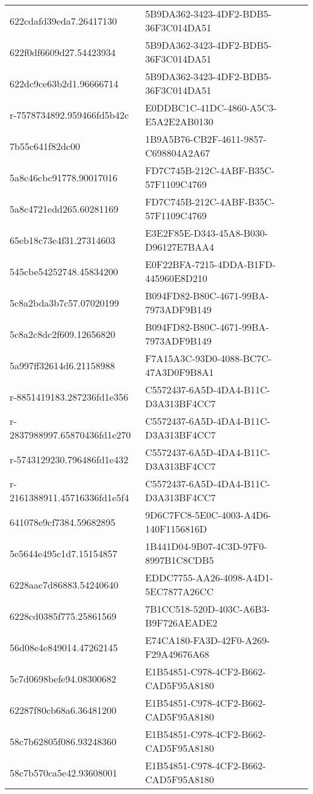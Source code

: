 \begin{tabular}{ll}
622cdafd39eda7.26417130 & 5B9DA362-3423-4DF2-BDB5-36F3C014DA51 \\
622f0df6609d27.54423934 & 5B9DA362-3423-4DF2-BDB5-36F3C014DA51 \\
622dc9ce63b2d1.96666714 & 5B9DA362-3423-4DF2-BDB5-36F3C014DA51 \\
r-7578734892.959466fd5b42c & E0DDBC1C-41DC-4860-A5C3-E5A2E2AB0130 \\
7b55c641f82dc00 & 1B9A5B76-CB2F-4611-9857-C698804A2A67 \\
5a8c46cbc91778.90017016 & FD7C745B-212C-4ABF-B35C-57F1109C4769 \\
5a8c4721edd265.60281169 & FD7C745B-212C-4ABF-B35C-57F1109C4769 \\
65eb18c73e4f31.27314603 & E3E2F85E-D343-45A8-B030-D96127E7BAA4 \\
545cbe54252748.45834200 & E0F22BFA-7215-4DDA-B1FD-445960E8D210 \\
5c8a2bda3b7c57.07020199 & B094FD82-B80C-4671-99BA-7973ADF9B149 \\
5c8a2c8dc2f609.12656820 & B094FD82-B80C-4671-99BA-7973ADF9B149 \\
5a997ff32614d6.21158988 & F7A15A3C-93D0-4088-BC7C-47A3D0F9B8A1 \\
r-8851419183.287236fd1e356 & C5572437-6A5D-4DA4-B11C-D3A313BF4CC7 \\
r-2837988997.65870436fd1e270 & C5572437-6A5D-4DA4-B11C-D3A313BF4CC7 \\
r-5743129230.796486fd1e432 & C5572437-6A5D-4DA4-B11C-D3A313BF4CC7 \\
r-2161388911.45716336fd1e5f4 & C5572437-6A5D-4DA4-B11C-D3A313BF4CC7 \\
641078e9cf7384.59682895 & 9D6C7FC8-5E0C-4003-A4D6-140F1156816D \\
5e5644e495c1d7.15154857 & 1B441D04-9B07-4C3D-97F0-8997B1C8CDB5 \\
6228aac7d86883.54240640 & EDDC7755-AA26-4098-A4D1-5EC7877A26CC \\
6228cd0385f775.25861569 & 7B1CC518-520D-403C-A6B3-B9F726AEADE2 \\
56d08e4e849014.47262145 & E74CA180-FA3D-42F0-A269-F29A49676A68 \\
5c7d0698befe94.08300682 & E1B54851-C978-4CF2-B662-CAD5F95A8180 \\
62287f80cb68a6.36481200 & E1B54851-C978-4CF2-B662-CAD5F95A8180 \\
58c7b62805f086.93248360 & E1B54851-C978-4CF2-B662-CAD5F95A8180 \\
58c7b570ca5e42.93608001 & E1B54851-C978-4CF2-B662-CAD5F95A8180 \\

\end{tabular}

